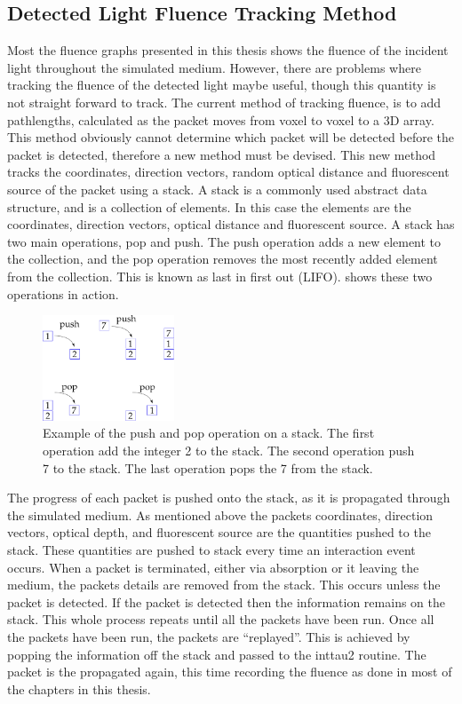 \begin{appendices}
\chapter{Detected Light Fluence Tracking Method}
\label{app:lightdect}

Most the fluence graphs presented in this thesis shows the fluence of the incident light throughout the simulated medium.
However, there are problems where tracking the fluence of the detected light maybe useful, though this quantity is not straight forward to track.
The current method of tracking fluence, is to add pathlengths, calculated as the packet moves from voxel to voxel to a 3D array. 
This method obviously cannot determine which packet will be detected before the packet is detected, therefore a new method must be devised.
This new method tracks the coordinates, direction vectors, random optical distance and fluorescent source of the packet using a stack.
A stack is a commonly used abstract data structure, and is a collection of elements.
In this case the elements are the coordinates, direction vectors, optical distance and fluorescent source.
A stack has two main operations, pop and push.
The push operation adds a new element to the collection, and the pop operation removes the most recently added element from the collection.
This is known as last in first out (LIFO).
 shows these two operations in action.

\begin{figure}[!htpb]
	\centering
	\includegraphics[width=0.35\textwidth]{stack.pdf}
	\caption{Example of the push and pop operation on a stack. The first operation add the integer 2 to the stack. The second operation push 7 to the stack. The last operation pops the 7 from the stack.}
	\label{fig:stack}
\end{figure}

The progress of each packet is pushed onto the stack, as it is propagated through the simulated medium. 
As mentioned above the packets coordinates, direction vectors, optical depth, and fluorescent source are the quantities pushed to the stack.
These quantities are pushed to stack every time an interaction event occurs.
When a packet is terminated, either via absorption or it leaving the medium, the packets details are removed from the stack.
This occurs unless the packet is detected.
If the packet is detected then the information remains on the stack.
This whole process repeats until all the packets have been run.
Once all the packets have been run, the packets are ``replayed''.
This is achieved by popping the information off the stack and passed to the inttau2 routine.
The packet is the propagated again, this time recording the fluence as done in most of the chapters in this thesis.

\end{appendices}
